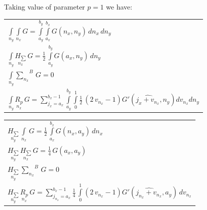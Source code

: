\documentclass[twoside, 10pt]{article}
\begin{document}
\begin{multicols}{2}

Taking value of parameter \(p = 1\) we have:

    \begin{center}
\begin{tabular}{ | l | }
\hline

$\int\limits_{n_y}^{} \int\limits_{n_x}^{} G = \int\limits_{a_{y}}^{b_{y}} \int\limits_{a_{x}}^{b_{x}} G\left(n_{x}, n_{y}\right)\,{d n_{x}}\,{d n_{y}}$ \\

$\int\limits_{n_y}^{} \underset{n_x}{H_{\sum}}\,G = \frac{1}{2} \, \int\limits_{a_{y}}^{b_{y}} G\left(a_{x}, n_{y}\right)\,{d n_{y}}$ \\

$\int\limits_{n_y}^{} {\sum\limits_{n_x}^{}}^{B}\,G = 0$ \\

$\int\limits_{n_y}^{} \underset{n_x}{R_{p}}\,G = {\sum\limits_{j_{x}=a_{x}}^{b_{x} - 1} \int\limits_{a_{y}}^{b_{y}} \int\limits_{0}^{1} \frac{1}{2} \, {\left(2 \, v_{n_{x}} - 1\right)} G'\left(\widehat{j_{x} + v_{n_{x}}}, n_{y}\right){d v_{n_{x}}}{d n_{y}}}$ \\

\hline

\end{tabular}
\end{center}

    \begin{center}
\begin{tabular}{ | l | }

\hline

$\underset{n_y}{H_{\sum}}\,\int\limits_{n_x}^{}\,G = \frac{1}{2} \, \int\limits_{a_{x}}^{b_{x}} G\left(n_{x}, a_{y}\right)\,{d n_{x}}$ \\

$\underset{n_y}{H_{\sum}}\,\underset{n_x}{H_{\sum}}\,G = \frac{1}{4} \, G\left(a_{x}, a_{y}\right)$ \\

$\underset{n_y}{H_{\sum}}\,{\sum\limits_{n_x}^{}}^{B}\,G = 0$ \\

$\underset{n_y}{H_{\sum}}\,\underset{n_x}{R_{p}}\,G = {\sum\limits_{j_{n_{x}}=a_{x}}^{b_{x} - 1} \frac{1}{4} \, \int\limits_{0}^{1} \left(2 \, v_{n_{x}} - 1 \right) G'\left(\widehat{j_{n_{x}} + v_{n_{x}}}, a_{y}\right)\,{d v_{n_{x}}} }$ \\

\hline


\end{tabular}
\end{center}
\end{multicols}
\end{document}
